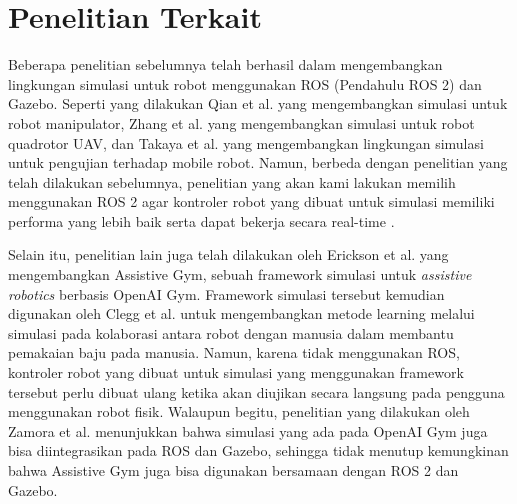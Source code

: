 \section{Penelitian Terkait}
\label{sec:penelitianterkait}

Beberapa penelitian sebelumnya telah berhasil dalam mengembangkan lingkungan simulasi untuk robot menggunakan ROS (Pendahulu ROS 2) dan Gazebo.
Seperti yang dilakukan Qian et al. \citep{qian2014} yang mengembangkan simulasi untuk robot manipulator, Zhang et al. \citep{zhang2015} yang mengembangkan simulasi untuk robot quadrotor UAV, dan Takaya et al. \citep{takaya2016} yang mengembangkan lingkungan simulasi untuk pengujian terhadap mobile robot.
Namun, berbeda dengan penelitian yang telah dilakukan sebelumnya, penelitian yang akan kami lakukan memilih menggunakan ROS 2 agar kontroler robot yang dibuat untuk simulasi memiliki performa yang lebih baik serta dapat bekerja secara real-time \citep{maruyama2016}.

Selain itu, penelitian lain juga telah dilakukan oleh Erickson et al. \citep{erickson2020} yang mengembangkan Assistive Gym, sebuah framework simulasi untuk \emph{assistive robotics} berbasis OpenAI Gym.
Framework simulasi tersebut kemudian digunakan oleh Clegg et al. \citep{clegg2020} untuk mengembangkan metode learning melalui simulasi pada kolaborasi antara robot dengan manusia dalam membantu pemakaian baju pada manusia.
Namun, karena tidak menggunakan ROS, kontroler robot yang dibuat untuk simulasi yang menggunakan framework tersebut perlu dibuat ulang ketika akan diujikan secara langsung pada pengguna menggunakan robot fisik.
Walaupun begitu, penelitian yang dilakukan oleh Zamora et al. \citep{zamora2016} menunjukkan bahwa simulasi yang ada pada OpenAI Gym juga bisa diintegrasikan pada ROS dan Gazebo, sehingga tidak menutup kemungkinan bahwa Assistive Gym juga bisa digunakan bersamaan dengan ROS 2 dan Gazebo.
